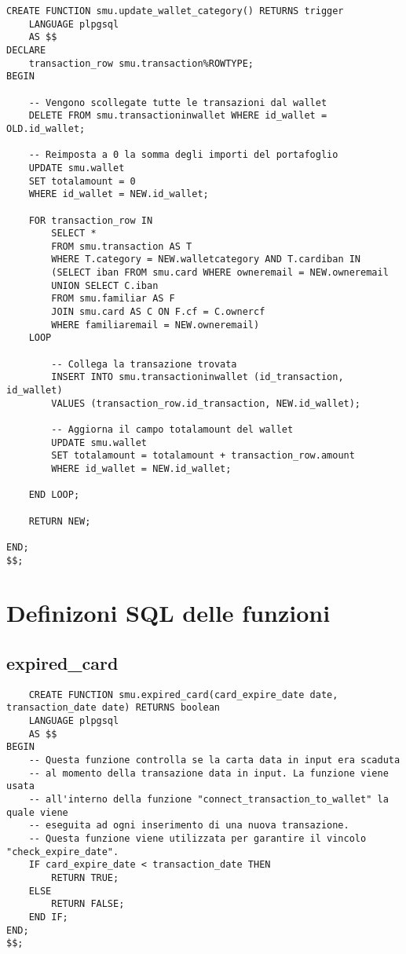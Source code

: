 \begin{lstlisting}
CREATE FUNCTION smu.update_wallet_category() RETURNS trigger
    LANGUAGE plpgsql
    AS $$
DECLARE
    transaction_row smu.transaction%ROWTYPE;
BEGIN

    -- Vengono scollegate tutte le transazioni dal wallet
    DELETE FROM smu.transactioninwallet WHERE id_wallet = OLD.id_wallet;

    -- Reimposta a 0 la somma degli importi del portafoglio
    UPDATE smu.wallet
    SET totalamount = 0
    WHERE id_wallet = NEW.id_wallet;

    FOR transaction_row IN
        SELECT *
        FROM smu.transaction AS T
        WHERE T.category = NEW.walletcategory AND T.cardiban IN 
        (SELECT iban FROM smu.card WHERE owneremail = NEW.owneremail
        UNION SELECT C.iban
        FROM smu.familiar AS F
        JOIN smu.card AS C ON F.cf = C.ownercf
        WHERE familiaremail = NEW.owneremail)
    LOOP

        -- Collega la transazione trovata
        INSERT INTO smu.transactioninwallet (id_transaction, id_wallet)
        VALUES (transaction_row.id_transaction, NEW.id_wallet);

        -- Aggiorna il campo totalamount del wallet
        UPDATE smu.wallet
        SET totalamount = totalamount + transaction_row.amount
        WHERE id_wallet = NEW.id_wallet;

    END LOOP;

    RETURN NEW;
    
END;
$$;
\end{lstlisting}

\section{Definizoni SQL delle funzioni}

\subsection{expired\_card}

\begin{lstlisting}
    CREATE FUNCTION smu.expired_card(card_expire_date date, transaction_date date) RETURNS boolean
    LANGUAGE plpgsql
    AS $$
BEGIN
    -- Questa funzione controlla se la carta data in input era scaduta
    -- al momento della transazione data in input. La funzione viene usata
    -- all'interno della funzione "connect_transaction_to_wallet" la quale viene
    -- eseguita ad ogni inserimento di una nuova transazione.
    -- Questa funzione viene utilizzata per garantire il vincolo "check_expire_date".
    IF card_expire_date < transaction_date THEN
        RETURN TRUE;
    ELSE
        RETURN FALSE;
    END IF;
END;
$$;
\end{lstlisting}